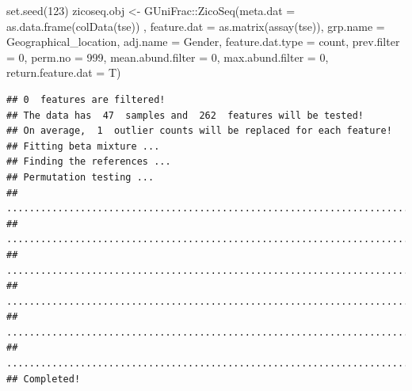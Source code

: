 \documentclass[
]{book}
\newenvironment{Shaded}{\begin{snugshade}}{\end{snugshade}}
\newcommand{\AttributeTok}[1]{\textcolor[rgb]{0.77,0.63,0.00}{#1}}
\newcommand{\DecValTok}[1]{\textcolor[rgb]{0.00,0.00,0.81}{#1}}
\newcommand{\FunctionTok}[1]{\textcolor[rgb]{0.00,0.00,0.00}{#1}}
\newcommand{\NormalTok}[1]{#1}
\newcommand{\OtherTok}[1]{\textcolor[rgb]{0.56,0.35,0.01}{#1}}
\newcommand{\SpecialCharTok}[1]{\textcolor[rgb]{0.00,0.00,0.00}{#1}}
\newcommand{\StringTok}[1]{\textcolor[rgb]{0.31,0.60,0.02}{#1}}
\begin{document}
\begin{Shaded}
\begin{Highlighting}[]
\FunctionTok{set.seed}\NormalTok{(}\DecValTok{123}\NormalTok{)}
\NormalTok{zicoseq.obj }\OtherTok{\textless{}{-}}\NormalTok{ GUniFrac}\SpecialCharTok{::}\FunctionTok{ZicoSeq}\NormalTok{(}\AttributeTok{meta.dat =} \FunctionTok{as.data.frame}\NormalTok{(}\FunctionTok{colData}\NormalTok{(tse)) , }
                                 \AttributeTok{feature.dat =} \FunctionTok{as.matrix}\NormalTok{(}\FunctionTok{assay}\NormalTok{(tse)),}
                                 \AttributeTok{grp.name =} \StringTok{\textquotesingle{}Geographical\_location\textquotesingle{}}\NormalTok{,}
                                 \AttributeTok{adj.name =} \StringTok{\textquotesingle{}Gender\textquotesingle{}}\NormalTok{, }
                                 \AttributeTok{feature.dat.type =} \StringTok{\textquotesingle{}count\textquotesingle{}}\NormalTok{,}
                                 \AttributeTok{prev.filter =} \DecValTok{0}\NormalTok{,}
                                 \AttributeTok{perm.no =} \DecValTok{999}\NormalTok{,}
                                 \AttributeTok{mean.abund.filter =} \DecValTok{0}\NormalTok{,}
                                 \AttributeTok{max.abund.filter =} \DecValTok{0}\NormalTok{,}
                                 \AttributeTok{return.feature.dat =}\NormalTok{ T)}
\end{Highlighting}
\end{Shaded}

\begin{verbatim}
## 0  features are filtered!
## The data has  47  samples and  262  features will be tested!
## On average,  1  outlier counts will be replaced for each feature!
## Fitting beta mixture ...
## Finding the references ...
## Permutation testing ...
## ...................................................................................................
## ...................................................................................................
## ...................................................................................................
## ...................................................................................................
## ...................................................................................................
## ...................................................................................................
## Completed!
\end{verbatim}

\begin{Shaded}
\end{Shaded}
\end{document}
